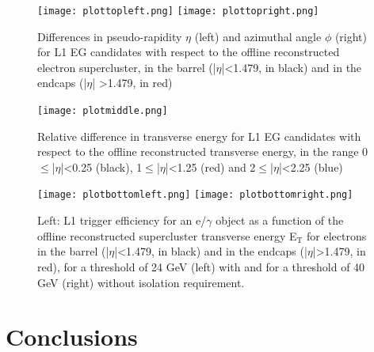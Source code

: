 \documentclass[a4paper,11pt]{article}
\begin{document}
\begin{figure}[htbp!]
\centering %
\texttt{[image: plottopleft.png]}
\qquad
\texttt{[image: plottopright.png]}
\caption{\label{fig:l}Differences in pseudo-rapidity $\eta$ (left) and azimuthal angle $\phi$ (right) for L1 EG candidates with respect to the
offline reconstructed electron supercluster, in the barrel (|$\eta$|<1.479, in black) and in the endcaps (|$\eta$| >1.479, in red)} 
\end{figure}

\begin{figure}[htbp!]
\centering %
\texttt{[image: plotmiddle.png]}
\qquad
\caption{\label{fig:m}Relative difference in transverse energy for L1 EG candidates with respect to the offline reconstructed transverse energy, in the range 0$\leq$|$\eta$|<0.25 (black), 1$\leq$|$\eta$|<1.25 (red) and 2$\leq$|$\eta$|<2.25 (blue)}
\end{figure}

\begin{figure}[htbp!]
\centering %
\texttt{[image: plotbottomleft.png]}
\qquad
\texttt{[image: plotbottomright.png]}
\caption{\label{fig:n}Left: L1 trigger efficiency for an e/$\gamma$ object as a function of the offline reconstructed supercluster transverse energy E$_\text{T}$ for electrons in the barrel (|$\eta$|<1.479, in black) and in the endcaps (|$\eta$|>1.479, in red), for a threshold of 24 GeV (left) with and for a threshold of 40 GeV (right) without isolation requirement.}
\end{figure}

\section{Conclusions}
\end{document}
